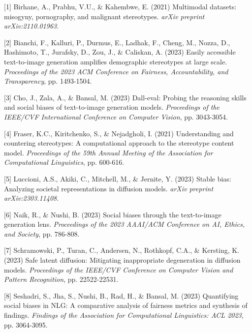 \documentclass{article}
\begin{document}
{
\small

[1] Birhane, A., Prabhu, V.U., \& Kahembwe, E. (2021) Multimodal datasets: misogyny, pornography, and malignant stereotypes. {\it arXiv preprint arXiv:2110.01963}.

[2] Bianchi, F., Kalluri, P., Durmus, E., Ladhak, F., Cheng, M., Nozza, D., Hashimoto, T., Jurafsky, D., Zou, J., \& Caliskan, A. (2023) Easily accessible text-to-image generation amplifies demographic stereotypes at large scale. {\it Proceedings of the 2023 ACM Conference on Fairness, Accountability, and Transparency}, pp. 1493-1504.

[3] Cho, J., Zala, A., \& Bansal, M. (2023) Dall-eval: Probing the reasoning skills and social biases of text-to-image generation models. {\it Proceedings of the IEEE/CVF International Conference on Computer Vision}, pp. 3043-3054.

[4] Fraser, K.C., Kiritchenko, S., \& Nejadgholi, I. (2021) Understanding and countering stereotypes: A computational approach to the stereotype content model. {\it Proceedings of the 59th Annual Meeting of the Association for Computational Linguistics}, pp. 600-616.

[5] Luccioni, A.S., Akiki, C., Mitchell, M., \& Jernite, Y. (2023) Stable bias: Analyzing societal representations in diffusion models. {\it arXiv preprint arXiv:2303.11408}.

[6] Naik, R., \& Nushi, B. (2023) Social biases through the text-to-image generation lens. {\it Proceedings of the 2023 AAAI/ACM Conference on AI, Ethics, and Society}, pp. 786-808.

[7] Schramowski, P., Turan, C., Andersen, N., Rothkopf, C.A., \& Kersting, K. (2023) Safe latent diffusion: Mitigating inappropriate degeneration in diffusion models. {\it Proceedings of the IEEE/CVF Conference on Computer Vision and Pattern Recognition}, pp. 22522-22531.

[8] Seshadri, S., Jha, S., Nushi, B., Rad, H., \& Bansal, M. (2023) Quantifying social biases in NLG: A comparative analysis of fairness metrics and synthesis of findings. {\it Findings of the Association for Computational Linguistics: ACL 2023}, pp. 3064-3095.

}
\end{document}
